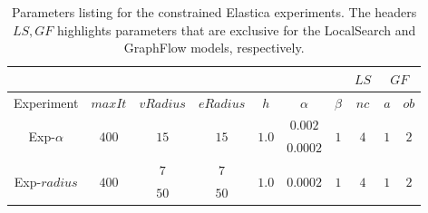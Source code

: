 \begin{table}
\centering
\begin{tabular}{|c|c|c|c|c|c|c|c|c|c|}
\cline{8-10}
\multicolumn{7}{c|}{} & $LS$ & \multicolumn{2}{|c|}{$GF$}\\
\hline
Experiment & $maxIt$ & $vRadius$ & $eRadius$ & $h$ & $\alpha$ & $\beta$  & $nc$ & $a$ & $ob$ \\
\hline
\multirow{2}{*}{Exp-$\alpha$} & \multirow{2}{*}{$400$} & \multirow{2}{*}{$15$} & \multirow{2}{*}{$15$} & \multirow{2}{*}{$1.0$} & $0.002$ & \multirow{2}{*}{$1$}  & \multirow{2}{*}{$4$} & \multirow{2}{*}{$1$} & \multirow{2}{*}{$2$} \\
& & & & & $0.0002$ & & &\\
\hline
\multirow{2}{*}{Exp-$radius$} & \multirow{2}{*}{$400$} & $7$ & $7$ & \multirow{2}{*}{$1.0$} & \multirow{2}{*}{$0.0002$} & \multirow{2}{*}{$1$}  & \multirow{2}{*}{$4$} & \multirow{2}{*}{$1$} & \multirow{2}{*}{$2$} \\
& & $50$ & $50$ & & & & &\\
\hline
\end{tabular}
\caption{Parameters listing for the constrained Elastica experiments. The headers $LS,GF$ highlights parameters that are exclusive for the LocalSearch and GraphFlow models, respectively.}
\label{tab:constrained-elastica-parameters-summary}
\end{table}

